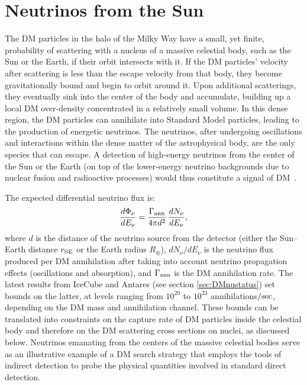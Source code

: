 \section{Neutrinos from the Sun}
\label{sec:DMnu}
The DM particles in the halo of the Milky Way have a small, yet finite, probability of scattering with a nucleus of a massive celestial body, such as the Sun or the Earth, if their orbit intersects with it.
If the DM particles' velocity after scattering is less than the escape velocity from that body, they become gravitationally bound and begin to orbit around it.
Upon additional scatterings, they eventually sink into the center of the body and accumulate, building up a local DM over-density concentrated in a relatively small volume. 
In this dense region, the DM particles can annihilate into Standard Model particles, leading to the production of energetic neutrinos.
The neutrinos, after undergoing oscillations and interactions within the dense matter of the astrophysical body, are the only species that can escape.
A detection of high-energy neutrinos from the center of the Sun or the Earth
(on top of the lower-energy neutrino backgrounds due to nuclear fusion and radioactive processes)
would thus constitute a signal of DM~\cite{DMnu}. 


\smallskip

The expected differential neutrino flux is:
\begin{equation}
\frac{d\Phi_\nu}{dE_\nu} = \frac{\Gamma_{\rm ann}}{4\pi d^2} \, \frac{dN_\nu}{dE_\nu},
\label{eq:nuflux}
\end{equation}
where $d$ is the distance of the neutrino source from the
detector (either the Sun--Earth distance $r_{\rm SE}$ or the Earth radius $R_\oplus$),
$dN_\nu/dE_\nu$ is the neutrino flux produced per DM annihilation after taking into account neutrino propagation effects
(oscillations and absorption), and $\Gamma_{\rm ann}$ is the DM annihilation rate.
The latest results from {\sc IceCube} and {\sc Antares} (see section \ref{sec:DMnustatus}) 
set bounds on the latter, at levels ranging from $10^{20}$ to $10^{23}$ annihilations$/{\rm sec}$, depending on the DM mass and annihilation channel. 
These bounds can be translated into constraints on the capture rate of DM particles inside the celestial body and therefore on the DM scattering cross sections on nuclei, as discussed below. 
Neutrinos emanating from the centers of the massive celestial bodies 
serve as an illustrative example of a DM search strategy that employs the tools of indirect detection to probe the physical quantities involved in standard direct detection.


